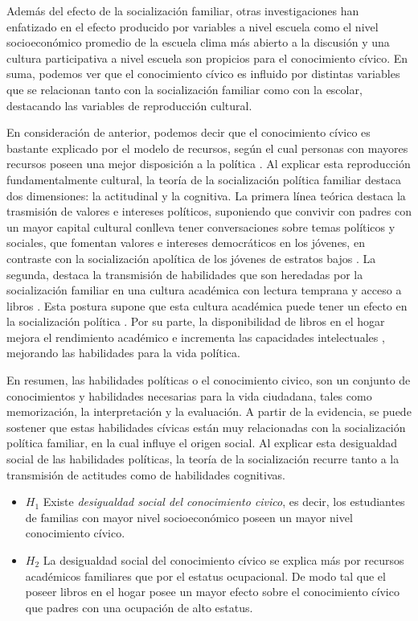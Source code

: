\documentclass[12pt,twoside]{templates/facsothesis}
\begin{document}
Además del efecto de la socialización familiar, otras investigaciones han enfatizado en el efecto producido por variables a nivel escuela como el nivel socioeconómico promedio de la escuela clima más abierto a la discusión y una cultura participativa a nivel escuela son propicios para el conocimiento cívico. En suma, podemos ver que el conocimiento cívico es influido por distintas variables que se relacionan tanto con la socialización familiar como con la escolar, destacando las variables de reproducción cultural.

En consideración de anterior, podemos decir que el conocimiento cívico es bastante explicado por el modelo de recursos, según el cual personas con mayores recursos poseen una mejor disposición a la política \citep{miranda_Desigualdad_2015}. Al explicar esta reproducción fundamentalmente cultural, la teoría de la socialización política familiar destaca dos dimensiones: la actitudinal y la cognitiva. La primera línea teórica destaca la trasmisión de valores e intereses políticos, suponiendo que convivir con padres con un mayor capital cultural conlleva tener conversaciones sobre temas políticos y sociales, que fomentan valores e intereses democráticos en los jóvenes, en contraste con la socialización apolítica de los jóvenes de estratos bajos \citep{gimpel_Cultivating_2003, wasburn_Making_2017}. La segunda, destaca la transmisión de habilidades que son heredadas por la socialización familiar en una cultura académica con lectura temprana y acceso a libros \citep{evans_Scholarly_2015, park_Home_2008}. Esta postura supone que esta cultura académica puede tener un efecto en la socialización política \citep{duarte_influence_2017, boeve-depauw_crossnational_2010}. Por su parte, la disponibilidad de libros en el hogar mejora el rendimiento académico e incrementa las capacidades intelectuales \citep{evans_Scholarly_2015}, mejorando las habilidades para la vida política.

En resumen, las habilidades políticas o el conocimiento civico, son un conjunto de conocimientos y habilidades necesarias para la vida ciudadana, tales como memorización, la interpretación y la evaluación. A partir de la evidencia, se puede sostener que estas habilidades cívicas están muy relacionadas con la socialización política familiar, en la cual influye el origen social. Al explicar esta desigualdad social de las habilidades políticas, la teoría de la socialización recurre tanto a la transmisión de actitudes como de habilidades cognitivas.

\begin{itemize}
\item
  \(H_1\) Existe \emph{desigualdad social del conocimiento civico}, es decir, los estudiantes de familias con mayor nivel socioeconómico poseen un mayor nivel conocimiento cívico.
\item
  \(H_2\) La desigualdad social del conocimiento cívico se explica más por recursos académicos familiares que por el estatus ocupacional. De modo tal que el poseer libros en el hogar posee un mayor efecto sobre el conocimiento cívico que padres con una ocupación de alto estatus.
\end{itemize}
\end{document}
